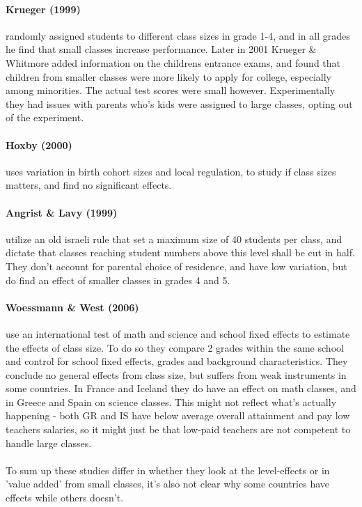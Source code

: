 \documentclass[12pt, a4paper]{article}
\begin{document}
\begin{multicols}{2}
\paragraph{Krueger (1999)} randomly assigned students to different class sizes in grade 1-4, and in all grades he find that small classes increase performance. Later in 2001 Krueger \& Whitmore added information on the childrens entrance exams, and found that children from smaller classes were more likely to apply for college, especially among minorities. The actual test scores were small however. Experimentally they had issues with parents who's kids were assigned to large classes, opting out of the experiment.

\paragraph{Hoxby (2000)} uses variation in birth cohort sizes and local regulation, to study if class sizes matters, and find no significant effects.

\paragraph{Angrist \& Lavy (1999)} utilize an old israeli rule that set a maximum size of 40 students per class, and dictate that classes reaching student numbers above this level shall be cut in half. They don't account for parental choice of residence, and have low variation, but do find an effect of smaller classes in grades 4 and 5.

\paragraph{Woessmann \& West (2006)} use an international test of math and science and school fixed effects to estimate the effects of class size. To do so they compare 2 grades within the same school and control for school fixed effects, grades and background characteristics. They conclude no general effects from class size, but suffers from weak instruments in some countries. In France and Iceland they do have an effect on math classes, and in Greece and Spain on science classes. This might not reflect what's actually happening - both GR and IS have below average overall attainment and pay low teachers salaries, so it might just be that low-paid teachers are not competent to handle large classes.
\\ \\
To sum up these studies differ in whether they look at the level-effects or in 'value added' from small classes, it's also not clear why some countries have effects while others doesn't.


\end{multicols}
\end{document}
